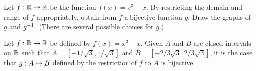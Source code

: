 \documentclass[../main.tex]{subfiles}
\begin{document}
\problem{}\label{s2p6}

Let \({f}: {\mathbb{R}} \mapsto{} {\mathbb{R}}\) be the function \(f(x) = x^3 - x\). By
restricting the domain and range of \(f\) appropriately, obtain from \(f\) a
bijective function \(g\). Draw the graphs of \(g\) and \({g}^{-1}\). (There
are several possible choices for \(g\).)

\begin{thm}
	Let \({f}: {\mathbb{R}} \mapsto{} {\mathbb{R}}\) be defined by \(f(x) = x^3 - x\).
	Given \(A\) and \(B\) are closed intervals on \(\mathbb{R}\) such that
	\(A = [-1/\sqrt{3},1/\sqrt{3}]\) and \(B = [-2/3\sqrt{3},2/3\sqrt{3}]\),
	it is the case that \({g}: {A} \mapsto{} {B}\) defined by the restriction of
	\(f\) to \(A\) is bijective.
\end{thm}
\todo{}
%
\end{document}
